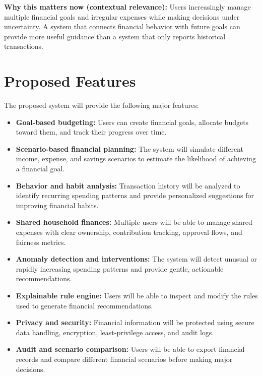 \documentclass[11pt,a4paper]{article}
\begin{document}
\textbf{Why this matters now (contextual relevance):} Users increasingly manage
multiple financial goals and irregular expenses while making decisions under
uncertainty. A system that connects financial behavior with future goals can
provide more useful guidance than a system that only reports historical
transactions.
\section{Proposed Features}

The proposed system will provide the following major features:

\begin{itemize}[leftmargin=0.7cm]

\item \textbf{Goal-based budgeting:} Users can create financial goals, allocate budgets toward them, and track their progress over time.

\item \textbf{Scenario-based financial planning:} The system will simulate different income, expense, and savings scenarios to estimate the likelihood of achieving a financial goal.

\item \textbf{Behavior and habit analysis:} Transaction history will be analyzed to identify recurring spending patterns and provide personalized suggestions for improving financial habits.

\item \textbf{Shared household finances:} Multiple users will be able to manage shared expenses with clear ownership, contribution tracking, approval flows, and fairness metrics.

\item \textbf{Anomaly detection and interventions:} The system will detect unusual or rapidly increasing spending patterns and provide gentle, actionable recommendations.

\item \textbf{Explainable rule engine:} Users will be able to inspect and modify the rules used to generate financial recommendations.

\item \textbf{Privacy and security:} Financial information will be protected using secure data handling, encryption, least-privilege access, and audit logs.

\item \textbf{Audit and scenario comparison:} Users will be able to export financial records and compare different financial scenarios before making major decisions.

\end{itemize}
\end{document}
